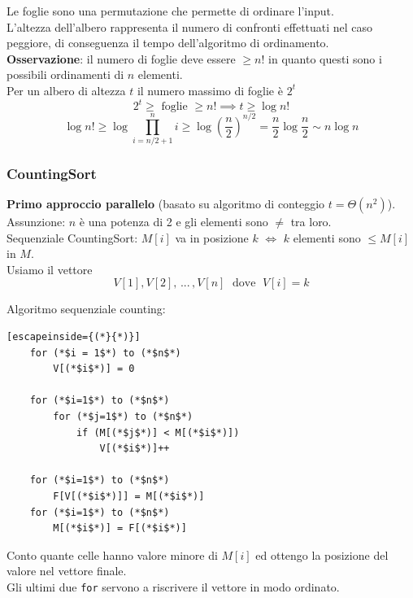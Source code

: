 \documentclass[11pt]{article}
\begin{document}
	Le foglie sono una permutazione che permette di ordinare l'input.\\
	L'altezza dell'albero rappresenta il numero di confronti effettuati nel caso peggiore, di conseguenza il tempo dell'algoritmo di ordinamento.\\
	
	\textbf{Osservazione}: il numero di foglie deve essere $\geq n!$ in quanto questi sono i possibili ordinamenti di $n$ elementi.\\
	Per un albero di altezza $t$ il numero massimo di foglie è $2^t$
	$$ 2^t \geq \text{ foglie } \geq n! \implies t \geq \log n! $$
	$$ \log n! \geq \log \prod_{i = n/2 + 1}^n i \geq \log \left(\frac{n}{2}\right)^{n/2} = \frac{n}{2} \log \frac{n}{2} \sim n \log n $$
	
	\newpage
	
	\subsubsection{CountingSort}
	
	\textbf{Primo approccio parallelo } (basato su algoritmo di conteggio $t = \Theta (n^2)$).\\
	
	Assunzione: $n$ è una potenza di 2 e gli elementi sono $\neq$ tra loro.\\
	
	Sequenziale CountingSort: $M[i]$ va in posizione $k$ $\Leftrightarrow$ $k$ elementi sono $\leq M[i]$ in $M$.\\
	
	Usiamo il vettore 
	$$ V[1], V[2], \, ... \, , V[n] \; \text{ dove }\; V[i] = k $$
	
	Algoritmo sequenziale counting:
	\begin{lstlisting}[escapeinside={(*}{*)}]
	for (*$i = 1$*) to (*$n$*)
		V[(*$i$*)] = 0
		
	for (*$i=1$*) to (*$n$*)
		for (*$j=1$*) to (*$n$*)
			if (M[(*$j$*)] < M[(*$i$*)])
				V[(*$i$*)]++
		
	for (*$i=1$*) to (*$n$*)
		F[V[(*$i$*)]] = M[(*$i$*)]
	for (*$i=1$*) to (*$n$*)
		M[(*$i$*)] = F[(*$i$*)]
	\end{lstlisting}
	
	Conto quante celle hanno valore minore di $M[i]$ ed ottengo la posizione del valore nel vettore finale.\\
	Gli ultimi due \texttt{for} servono a riscrivere il vettore in modo ordinato.\\
	
\end{document}
